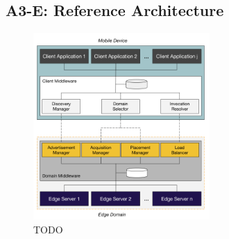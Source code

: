 \subsection{A3-E: Reference Architecture}\label{sec:a3-e-reference-architecture}

\begin{figure}
  \includegraphics[width=0.6\textwidth]{figs/reference-architecture.png}
  \caption{TODO}
  \label{fig:reference-architecture}
\end{figure}

